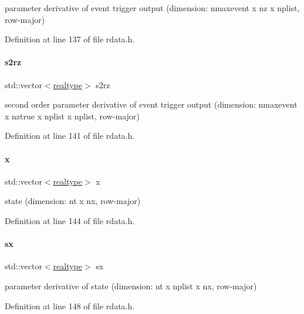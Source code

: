parameter derivative of event trigger output (dimension\+: nmaxevent x nz x nplist, row-\/major) 

Definition at line 137 of file rdata.\+h.

\mbox{\label{classamici_1_1_return_data_ade4be6e8e3e8cc9eb4642904e3e9ce56}} 
\paragraph{\texorpdfstring{s2rz}{s2rz}}
{\footnotesize\ttfamily std\+::vector$<$\mbox{\hyperlink{namespaceamici_a1bdce28051d6a53868f7ccbf5f2c14a3}{realtype}}$>$ s2rz}

second order parameter derivative of event trigger output (dimension\+: nmaxevent x nztrue x nplist x nplist, row-\/major) 

Definition at line 141 of file rdata.\+h.

\mbox{\label{classamici_1_1_return_data_a7ca297ad69affe8b20e8f81b9eb38cd1}} 
\paragraph{\texorpdfstring{x}{x}}
{\footnotesize\ttfamily std\+::vector$<$\mbox{\hyperlink{namespaceamici_a1bdce28051d6a53868f7ccbf5f2c14a3}{realtype}}$>$ x}

state (dimension\+: nt x nx, row-\/major) 

Definition at line 144 of file rdata.\+h.

\mbox{\label{classamici_1_1_return_data_ac3288cc7f649605938f1fd1b459d3d8c}} 
\paragraph{\texorpdfstring{sx}{sx}}
{\footnotesize\ttfamily std\+::vector$<$\mbox{\hyperlink{namespaceamici_a1bdce28051d6a53868f7ccbf5f2c14a3}{realtype}}$>$ sx}

parameter derivative of state (dimension\+: nt x nplist x nx, row-\/major) 

Definition at line 148 of file rdata.\+h.

